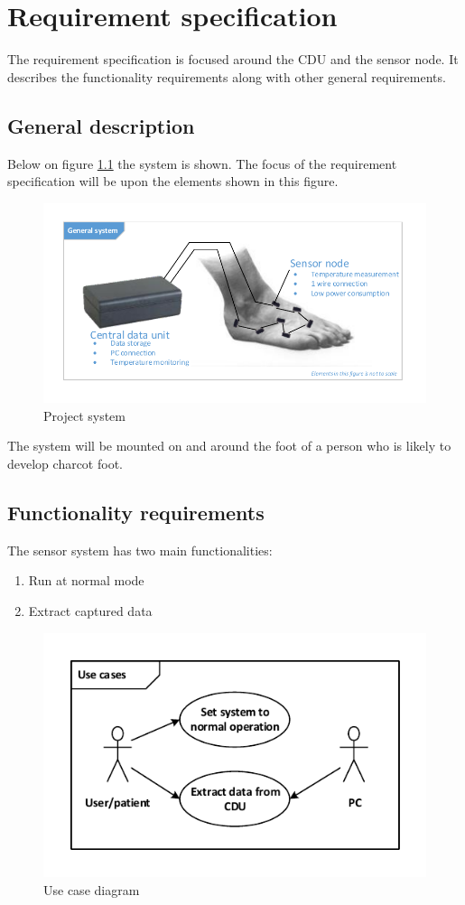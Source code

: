 \chapter{Requirement specification}

The requirement specification is focused around the CDU and the sensor node. It describes the functionality requirements along with other general requirements.

\section{General description}
Below on figure \ref{fig:project_system} the system is shown. The focus of the requirement specification will be upon the elements shown in this figure.

\begin{figure}[H]
	\centering
	\includegraphics[width=.9\textwidth]{billeder/7requirementspec/GeneralSystem}
	\caption{Project system}
	\label{fig:project_system}
\end{figure}

The system will be mounted on and around the foot of a person who is likely to develop charcot foot. 

\section{Functionality requirements}
The sensor system has two main functionalities:
\begin{enumerate}
	\item Run at normal mode
	\item Extract captured data
\end{enumerate}

\begin{figure}[H]
	\centering
	\includegraphics[width=.7\textwidth]{billeder/7requirementspec/usecase_vector}
	\caption{Use case diagram}
\end{figure}


